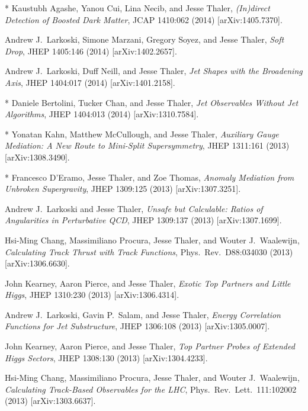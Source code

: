 \begin{list}{[]\addtocounter{jessecount}{-1}}{\leftmargin=3em \itemsep=4pt}
\item
* Kaustubh Agashe, Yanou Cui, Lina Necib, and Jesse Thaler,
\emph{(In)direct Detection of Boosted Dark Matter},
JCAP 1410:062 (2014)
[arXiv:1405.7370].

\item
 Andrew J.\ Larkoski, Simone Marzani, Gregory Soyez, and Jesse Thaler,
\emph{Soft Drop},
JHEP 1405:146 (2014)
[arXiv:1402.2657].

\item
 Andrew J.\ Larkoski, Duff Neill, and Jesse Thaler,
\emph{Jet Shapes with the Broadening Axis},
JHEP 1404:017 (2014)
[arXiv:1401.2158].

\item
* Daniele Bertolini, Tucker Chan, and Jesse Thaler,
\emph{Jet Observables Without Jet Algorithms},
JHEP 1404:013 (2014)
[arXiv:1310.7584].

\item
* Yonatan Kahn, Matthew McCullough, and Jesse Thaler,
\emph{Auxiliary Gauge Mediation: A New Route to Mini-Split Supersymmetry},
JHEP 1311:161 (2013)
[arXiv:1308.3490].

\item
* Francesco D'Eramo, Jesse Thaler, and Zoe Thomas,
\emph{Anomaly Mediation from Unbroken Supergravity},
JHEP 1309:125 (2013)
[arXiv:1307.3251].

\item
 Andrew J.\ Larkoski and Jesse Thaler,
\emph{Unsafe but Calculable: Ratios of Angularities in Perturbative QCD},
JHEP 1309:137 (2013)
[arXiv:1307.1699].

\item
 Hsi-Ming Chang, Massimiliano Procura, Jesse Thaler, and Wouter J.\ Waalewijn,
\emph{Calculating Track Thrust with Track Functions},
Phys.\ Rev.\ D88:034030 (2013)
[arXiv:1306.6630].

\item
 John Kearney, Aaron Pierce, and Jesse Thaler,
\emph{Exotic Top Partners and Little Higgs},
JHEP 1310:230 (2013)
[arXiv:1306.4314].

\item
 Andrew J.\ Larkoski, Gavin P.\ Salam, and Jesse Thaler,
\emph{Energy Correlation Functions for Jet Substructure},
JHEP 1306:108 (2013)
[arXiv:1305.0007].

\item
 John Kearney, Aaron Pierce, and Jesse Thaler,
\emph{Top Partner Probes of Extended Higgs Sectors},
JHEP 1308:130 (2013)
[arXiv:1304.4233].

\item
 Hsi-Ming Chang, Massimiliano Procura, Jesse Thaler, and Wouter J.\ Waalewijn,
\emph{Calculating Track-Based Observables for the LHC},
Phys.\ Rev.\ Lett.\ 111:102002 (2013)
[arXiv:1303.6637].


\end{list}
